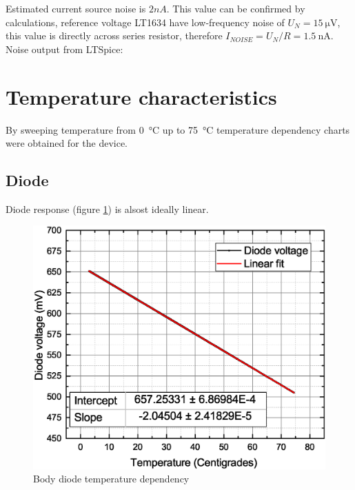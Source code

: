         Estimated current source noise is $2 nA$.
        This value can be confirmed by calculations, reference voltage LT1634 have low-frequency noise of $U_N = \SI{15}{\uV}$, this value is directly across series resistor, therefore $I_{NOISE} = U_N/R = \SI{1.5}{\nA}$. Noise output from LTSpice:



\section{Temperature characteristics}
    By sweeping temperature from \SI{0}{\degreeCelsius} up to \SI{75}{\degreeCelsius} temperature dependency charts were obtained for the device.

    \subsection{Diode}
        Diode response (figure \ref{Body_diode_temperature_dependency}) is alsost ideally linear.
        \begin{figure}[H]
            \centering
            \includegraphics[width=0.6\paperwidth]{img/07/diodeVsTemperature.eps}
            \caption{Body diode temperature dependency}
            \label{Body_diode_temperature_dependency}
        \end{figure}


